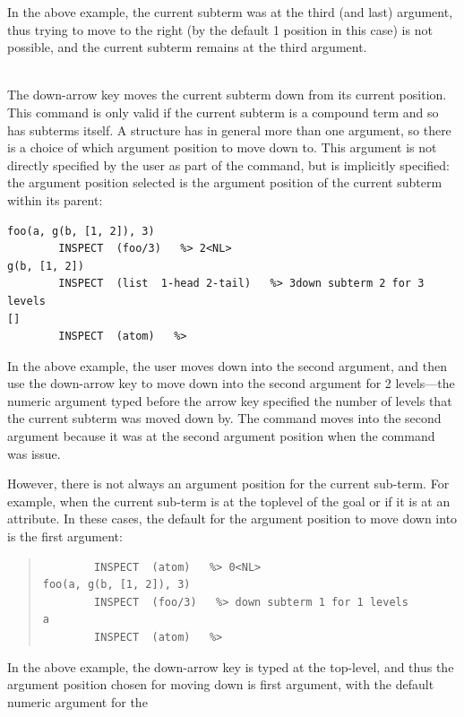 \begin{descr}{1cm}
In the above example, the current subterm was at the third (and last)
argument, thus trying to move to the right (by the default 1 position in
this case) is not possible, and the current subterm remains at the third
argument.

\\
The down-arrow key moves the current subterm down from its current
position. This command is only valid if the current subterm is a compound
term and so has subterms itself. A structure has in general more than one
argument, so there is a choice of which argument position to move down to.
This argument is not directly specified by the user as part of the command,
but is implicitly specified:
the argument position selected is the argument position of the current
subterm within its parent:
\begin{verbatim}
foo(a, g(b, [1, 2]), 3)
        INSPECT  (foo/3)   %> 2<NL>
g(b, [1, 2])
        INSPECT  (list  1-head 2-tail)   %> 3down subterm 2 for 3 levels
[]
        INSPECT  (atom)   %>
\end{verbatim}

In the above example, the user moves down into the second argument, and
then use the down-arrow key to move down into the second argument for 2
levels---the numeric argument typed before the arrow key specified the
number of levels that the current subterm was moved down by.
The command moves into the second argument because it was at the
second argument position when the command was issue.

However, there is not always an argument position for the current
sub-term. For example, when the current sub-term is at the toplevel of the goal
or if it is at an attribute. In these cases, the default for the argument
position to move down into is the first argument:
\begin{quote}
\begin{verbatim}
        INSPECT  (atom)   %> 0<NL>
foo(a, g(b, [1, 2]), 3)
        INSPECT  (foo/3)   %> down subterm 1 for 1 levels
a
        INSPECT  (atom)   %>
\end{verbatim}
\end{quote}

In the above example, the down-arrow key is typed at the top-level, and
thus the argument position chosen for moving down is first argument, with
the default numeric argument for the



\end{descr}
